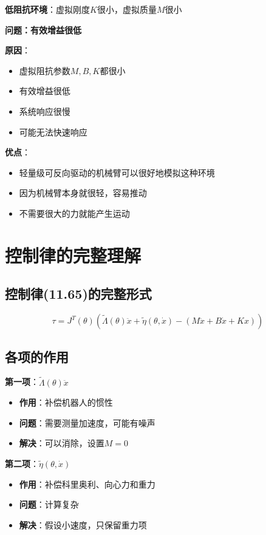 \documentclass[12pt,a4paper]{article}
\begin{document}
\textbf{低阻抗环境}：虚拟刚度$K$很小，虚拟质量$M$很小

\textbf{问题：有效增益很低}

\textbf{原因}：
\begin{itemize}
\item 虚拟阻抗参数$M, B, K$都很小
\item 有效增益很低
\item 系统响应很慢
\item 可能无法快速响应
\end{itemize}

\textbf{优点}：
\begin{itemize}
\item 轻量级可反向驱动的机械臂可以很好地模拟这种环境
\item 因为机械臂本身就很轻，容易推动
\item 不需要很大的力就能产生运动
\end{itemize}

\section{控制律的完整理解}

\subsection{控制律(11.65)的完整形式}

\begin{equation}
\tau = J^T(\theta)\left(\tilde{\Lambda}(\theta)\ddot{x} + \tilde{\eta}(\theta, \dot{x}) - (M\ddot{x} + B\dot{x} + Kx)\right) \tag{11.65}
\end{equation}

\subsection{各项的作用}

\textbf{第一项}：$\tilde{\Lambda}(\theta)\ddot{x}$
\begin{itemize}
\item \textbf{作用}：补偿机器人的惯性
\item \textbf{问题}：需要测量加速度，可能有噪声
\item \textbf{解决}：可以消除，设置$M = 0$
\end{itemize}

\textbf{第二项}：$\tilde{\eta}(\theta, \dot{x})$
\begin{itemize}
\item \textbf{作用}：补偿科里奥利、向心力和重力
\item \textbf{问题}：计算复杂
\item \textbf{解决}：假设小速度，只保留重力项
\end{itemize}
\end{document}
